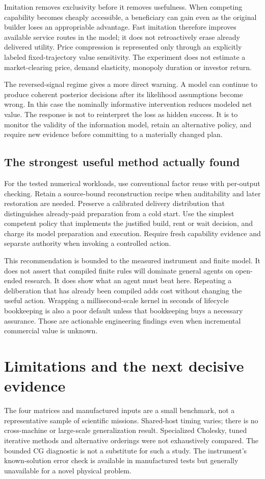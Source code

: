 \documentclass[11pt,a4paper]{article}
\begin{document}
Imitation removes exclusivity before it removes usefulness. When competing capability becomes cheaply accessible, a beneficiary can gain even as the original builder loses an appropriable advantage. Fast imitation therefore improves available service routes in the model; it does not retroactively erase already delivered utility. Price compression is represented only through an explicitly labeled fixed-trajectory value sensitivity. The experiment does not estimate a market-clearing price, demand elasticity, monopoly duration or investor return.

The reversed-signal regime gives a more direct warning. A model can continue to produce coherent posterior decisions after its likelihood assumptions become wrong. In this case the nominally informative intervention reduces modeled net value. The response is not to reinterpret the loss as hidden success. It is to monitor the validity of the information model, retain an alternative policy, and require new evidence before committing to a materially changed plan.

\subsection{The strongest useful method actually found}
For the tested numerical workloads, use conventional factor reuse with per-output checking. Retain a source-bound reconstruction recipe when auditability and later restoration are needed. Preserve a calibrated delivery distribution that distinguishes already-paid preparation from a cold start. Use the simplest competent policy that implements the justified build, rent or wait decision, and charge its model preparation and execution. Require fresh capability evidence and separate authority when invoking a controlled action.

This recommendation is bounded to the measured instrument and finite model. It does not assert that compiled finite rules will dominate general agents on open-ended research. It does show what an agent must beat here. Repeating a deliberation that has already been compiled adds cost without changing the useful action. Wrapping a millisecond-scale kernel in seconds of lifecycle bookkeeping is also a poor default unless that bookkeeping buys a necessary assurance. Those are actionable engineering findings even when incremental commercial value is unknown.

\section{Limitations and the next decisive evidence}
The four matrices and manufactured inputs are a small benchmark, not a representative sample of scientific missions. Shared-host timing varies; there is no cross-machine or large-scale generalization result. Specialized Cholesky, tuned iterative methods and alternative orderings were not exhaustively compared. The bounded CG diagnostic is not a substitute for such a study. The instrument's known-solution error check is available in manufactured tests but generally unavailable for a novel physical problem.
\end{document}
